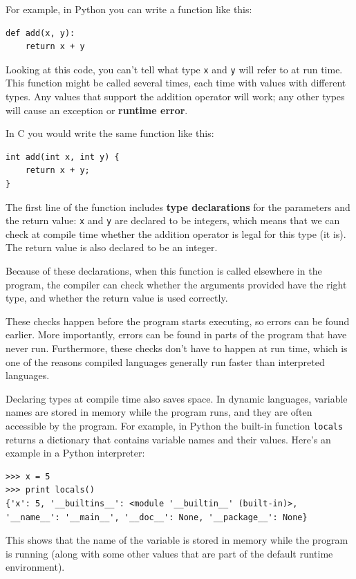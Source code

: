 \documentclass[12pt]{book}
\begin{document}
{For example, in Python you can write a function like this:

\begin{verbatim}
def add(x, y):
    return x + y
\end{verbatim}

Looking at this code, you can't tell what type {\tt x} and {\tt y}
will refer to at run time.  This function might be called several
times, each time with values with different types.  Any values that
support the addition operator will work; any other types will cause an
exception or {\bf runtime error}.

In C you would write the same function like this:

\begin{verbatim}
int add(int x, int y) {
    return x + y;
}
\end{verbatim}

The first line of the function includes {\bf type declarations} for the
parameters and the return value: {\tt x} and {\tt y} are declared to
be integers, which means that we can check at compile time
whether the addition operator is legal for this type (it is).  The
return value is also declared to be an integer.

Because of these declarations, when this function is called elsewhere
in the program, the compiler can check whether the arguments provided
have the right type, and whether the return value is used correctly.

These checks happen before the program starts executing, so errors can
be found earlier.  More importantly, errors can be found in parts
of the program that have never run.  Furthermore, these checks don't
have to happen at run time, which is one of the reasons compiled
languages generally run faster than interpreted languages.

Declaring types at compile time also saves space.  In dynamic
languages, variable names are stored in memory while the program runs,
and they are often accessible by the program.  For example, in Python
the built-in function {\tt locals} returns a dictionary that contains
variable names and their values.  Here's an example in a Python
interpreter:

\begin{verbatim}
>>> x = 5
>>> print locals()
{'x': 5, '__builtins__': <module '__builtin__' (built-in)>,
'__name__': '__main__', '__doc__': None, '__package__': None}
\end{verbatim}

This shows that the name of the variable is stored in memory while
the program is running (along with some other values that are part
of the default runtime environment).

}
\end{document}
